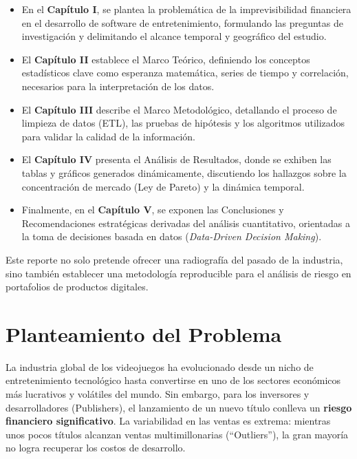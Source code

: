\documentclass[oneside,11pt]{Latex/Classes/PhDthesisPSnPDF}
\begin{document}
\begin{itemize}
    \item En el \textbf{Capítulo I}, se plantea la problemática de la imprevisibilidad financiera en el desarrollo de software de entretenimiento, formulando las preguntas de investigación y delimitando el alcance temporal y geográfico del estudio.
    
    \item El \textbf{Capítulo II} establece el Marco Teórico, definiendo los conceptos estadísticos clave como esperanza matemática, series de tiempo y correlación, necesarios para la interpretación de los datos.
    
    \item El \textbf{Capítulo III} describe el Marco Metodológico, detallando el proceso de limpieza de datos (ETL), las pruebas de hipótesis y los algoritmos utilizados para validar la calidad de la información.
    
    \item El \textbf{Capítulo IV} presenta el Análisis de Resultados, donde se exhiben las tablas y gráficos generados dinámicamente, discutiendo los hallazgos sobre la concentración de mercado (Ley de Pareto) y la dinámica temporal.
    
    \item Finalmente, en el \textbf{Capítulo V}, se exponen las Conclusiones y Recomendaciones estratégicas derivadas del análisis cuantitativo, orientadas a la toma de decisiones basada en datos (\textit{Data-Driven Decision Making}).
\end{itemize}

Este reporte no solo pretende ofrecer una radiografía del pasado de la
industria, sino también establecer una metodología reproducible para el
análisis de riesgo en portafolios de productos digitales.

\chapter{Planteamiento del Problema}

La industria global de los videojuegos ha evolucionado desde un nicho de
entretenimiento tecnológico hasta convertirse en uno de los sectores
económicos más lucrativos y volátiles del mundo. Sin embargo, para los
inversores y desarrolladores (Publishers), el lanzamiento de un nuevo
título conlleva un \textbf{riesgo financiero significativo}. La
variabilidad en las ventas es extrema: mientras unos pocos títulos
alcanzan ventas multimillonarias (``Outliers''), la gran mayoría no
logra recuperar los costos de desarrollo.
\end{document}
